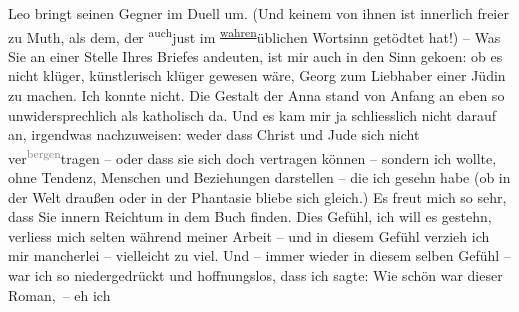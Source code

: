 \begin{ledgroupsized}[t]{13cm}
                  Leo bringt seinen Gegner im
               Duell um. (Und keinem von ihnen ist innerlich freier zu Muth, als dem, der \substVorne{}\textsuperscript{auch}\substDazwischen{}just\substHinten{} im \substVorne{}\textsuperscript{\uline{wahren}}{\allowbreak}\substDazwischen{}üblichen\substHinten{} Wortsinn getödtet hat!)\pend
           \pstart
           – Was Sie an einer Stelle Ihres Briefes andeuten, ist mir auch in den Sinn geko{\geminationm}en: ob es nicht klüger, künstlerisch klüger gewesen
               wäre, Georg zum Liebhaber
               einer Jüdin zu machen. Ich konnte nicht. Die Gestalt der Anna stand von Anfang an eben so
               unwidersprechlich als katholisch da. Und es kam mir ja schliesslich nicht darauf an,
               irgendwas nachzuweisen: weder dass Christ und Jude sich nicht ver\substVorne{}\textsuperscript{\textcolor{gray}{bergen}}{\allowbreak}\substDazwischen{}tragen\substHinten{} – oder dass sie sich doch vertragen können – sondern ich wollte, ohne
               Tendenz, {\pb}Menschen und Beziehungen darstellen –
               die ich gesehn habe (ob in der Welt draußen oder in der Phantasie bliebe sich
               gleich.)  Es freut mich so sehr, dass Sie
               innern Reichtum in dem Buch
               finden. Dies Gefühl, ich will es gestehn, verliess mich selten während meiner Arbeit
               – und in diesem Gefühl verzieh ich mir mancherlei – vielleicht zu viel. Und \introOben{}–\introOben{} immer wieder in diesem selben Gefühl – war ich so
               niedergedrückt und hoffnungslos, dass ich sagte: Wie schön war dieser Roman, – eh ich

\end{ledgroupsized}
